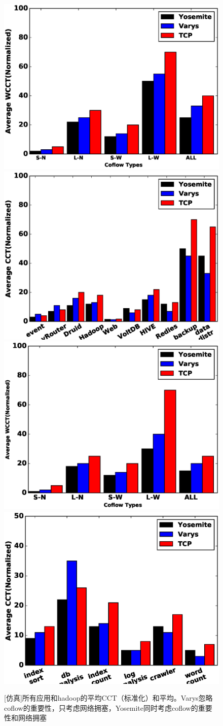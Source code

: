 \begin{figure}[h]
\setlength{\abovecaptionskip}{0pt} 
\setlength{\belowcaptionskip}{1pt} 
  \centering%
    {\includegraphics[width=0.5\columnwidth]{figures/Yosemite/figs/evaluation/ex1/evaluation_motivation1.eps}}%
      {\includegraphics[width=0.5\columnwidth]{figures/Yosemite/figs/evaluation/ex1/evaluation_motivation2.eps}}
    {\includegraphics[width=0.5\columnwidth]{figures/Yosemite/figs/evaluation/ex1/evaluation_motivation3.eps}}%
      {\includegraphics[width=0.5\columnwidth]{figures/Yosemite/figs/evaluation/ex1/evaluation_motivation4.eps}}
  \caption{[仿真]所有应用和hadoop的平均CCT（标准化）和平均。Varys忽略coflow的重要性，只考虑网络拥塞，Yosemite同时考虑coflow的重要性和网络拥塞}
  \label{Yosemite-evaluation_motivation_fig}
\end{figure}

